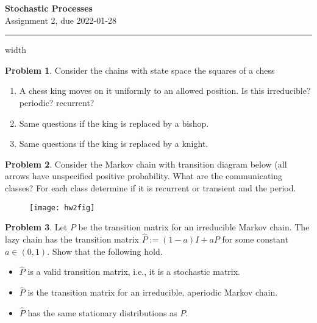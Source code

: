 \documentclass{article}
\theoremstyle{definition}
\newtheorem{problem}{Problem}
\begin{document}
\thispagestyle{crfooter}

\begin{center}
  {\LARGE \textbf{Stochastic Processes}} \\
  {\Large Assignment 2, due 2022-01-28}
\end{center}

\hrule width \textwidth \bigskip


\begin{problem}
  Consider the chains with state space the squares of a chess
  \begin{enumerate}
  \item A chess king moves on it uniformly to an allowed position.
    Is this irreducible? periodic? recurrent?
    \item Same questions if the king is replaced by a bishop.
    \item Same questions if the king is replaced by a knight.
  \end{enumerate}
\end{problem}


\begin{problem}
  Consider the Markov chain with transition diagram below (all arrows have unspecified positive probability.
  What are the communicating classes? For each class determine if it is recurrent or transient and the period.
\end{problem}

\begin{figure}[h]
  \centering \texttt{[image: hw2fig]}  
\end{figure}


\begin{problem}
  Let $P$ be the transition matrix for an irreducible Markov chain.
  The lazy chain has the transition matrix $\hat P := (1-a) I + a P$ for some constant $a\in(0,1)$.
  Show that the following hold.
  \begin{itemize}
  \item $\hat P$ is a valid transition matrix, i.e., it is a stochastic
    matrix.
  \item $\hat P$ is the transition matrix for an irreducible, aperiodic Markov chain.
  \item $\hat P$ has the same stationary distributions as $P$.
  \end{itemize}
\end{problem}
\end{document}
